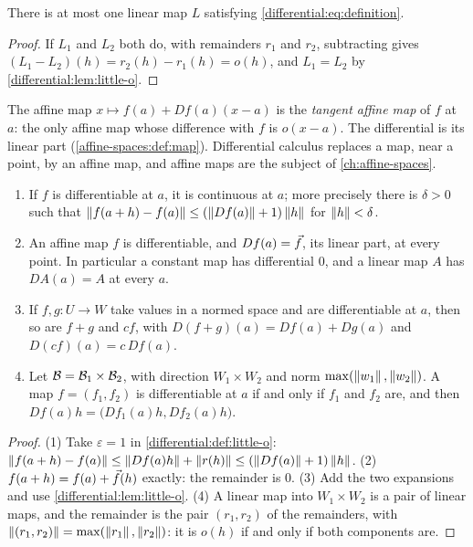 \begin{notechapter}
\begin{proposition}[Uniqueness]\label{differential:prop:unique}
There is at most one linear map $L$ satisfying
\eqref{differential:eq:definition}.
\end{proposition}

\begin{proof}
If $L_1$ and $L_2$ both do, with remainders $r_1$ and $r_2$, subtracting
gives $(L_1 - L_2)(h) = r_2(h) - r_1(h) = o(h)$, and $L_1 = L_2$ by
\cref{differential:lem:little-o}.
\end{proof}

\begin{keyidea}
The affine map $x\mapsto f(a) + Df(a)(x - a)$ is the \emph{tangent affine
map} of $f$ at $a$: the only affine map whose difference with $f$ is
$o(x - a)$. The differential is its linear part
(\cref{affine-spaces:def:map}). Differential calculus replaces a map,
near a point, by an affine map, and affine maps are the subject of
\cref{ch:affine-spaces}.
\end{keyidea}

\begin{proposition}\label{differential:prop:first}
\begin{enumerate}[nosep]
  \item If $f$ is differentiable at $a$, it is continuous at $a$; more
        precisely there is $\delta > 0$ such that
        $\left\|f(a + h) - f(a)\right\|\leq(\left\|Df(a)\right\| + 1)\left\|h\right\|$ for
        $\left\|h\right\| < \delta$.
  \item An affine map $f$ is differentiable, and $Df(a) = \vec{f}$, its
        linear part, at every point. In particular a constant map has
        differential $0$, and a linear map $A$ has $DA(a) = A$ at every
        $a$.
  \item If $f, g:U\to W$ take values in a normed space and are
        differentiable at $a$, then so are $f + g$ and $cf$, with
        $D(f + g)(a) = Df(a) + Dg(a)$ and $D(cf)(a) = c\,Df(a)$.
  \item Let $\mathcal{B} = \mathcal{B}_1\times\mathcal{B}_2$, with direction $W_1\times W_2$
        and norm $\max(\left\|w_1\right\|, \left\|w_2\right\|)$. A map $f = (f_1, f_2)$ is
        differentiable at $a$ if and only if $f_1$ and $f_2$ are, and then
        $Df(a)h = \bigl(Df_1(a)h, Df_2(a)h\bigr)$.
\end{enumerate}
\end{proposition}

\begin{proof}
(1) Take $\varepsilon = 1$ in \cref{differential:def:little-o}:
$\left\|f(a + h) - f(a)\right\|\leq\left\|Df(a)h\right\| + \left\|r(h)\right\|
\leq(\left\|Df(a)\right\| + 1)\left\|h\right\|$. (2) $f(a + h) = f(a) + \vec{f}(h)$ exactly:
the remainder is $0$. (3) Add the two expansions and use
\cref{differential:lem:little-o}. (4) A linear map into $W_1\times W_2$ is
a pair of linear maps, and the remainder is the pair $(r_1, r_2)$ of the
remainders, with $\left\|(r_1, r_2)\right\| = \max(\left\|r_1\right\|, \left\|r_2\right\|)$: it is
$o(h)$ if and only if both components are.
\end{proof}


\end{notechapter}
